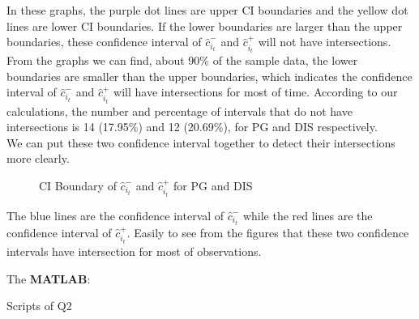 \documentclass[12pt,letterpaper]{article}
\begin{document}
\begin{enumerate}[label=\textbf{(\Alph*)}]
\begin{enumerate}[label=(\roman*)]
In these graphs, the purple dot lines are upper CI boundaries and the yellow dot lines are lower CI boundaries. If the lower boundaries are larger than the upper boundaries, these confidence interval of $\hat{c}_{i_t}^-$ and $\hat{c}_{i_t}^+$ will not have intersections.\\

From the graphs we can find, about 90\% of the sample data, the lower boundaries are smaller than the upper boundaries, which indicates the confidence interval of $\hat{c}_{i_t}^-$ and $\hat{c}_{i_t}^+$ will have intersections for most of time. According to our calculations, the number and percentage of intervals that do not have intersections is 14 (17.95\%) and 12 (20.69\%), for PG and DIS respectively.\\

We can put these two confidence interval together to detect their intersections more clearly.

 \begin{figure}[H]
	\centering
	\caption{CI Boundary of $\hat{c}_{i_t}^-$ and $\hat{c}_{i_t}^+$ for PG and DIS}
\end{figure}
The blue lines are the confidence interval of $\hat{c}_{i_t}^-$ while the red lines are the confidence interval of $\hat{c}_{i_t}^+$. Easily to see from the figures that these two confidence intervals have intersection for most of observations.\\




\end{enumerate}
The \textbf{MATLAB}:

Scripts of Q2
   
\end{enumerate}
\newpage
\end{document}
